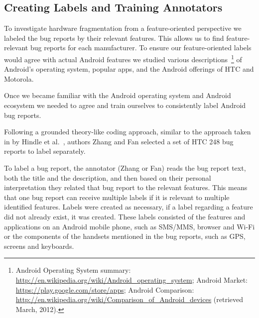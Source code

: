 \documentclass[10pt, conference, compsocconf]{IEEEtran}
\begin{document}
\subsection{Creating Labels and Training Annotators}


To investigate hardware fragmentation from a feature-oriented
perspective we labeled the bug reports by their
relevant features. This allows us to find feature-relevant bug reports
for each manufacturer.
To ensure our feature-oriented labels would agree with actual
Android features we studied various descriptions~\footnote{Android Operating System summary:
\url{http://en.wikipedia.org/wiki/Android_operating_system};
Android Market: \url{https://play.google.com/store/apps};
Android Comparison:
\url{http://en.wikipedia.org/wiki/Comparison_of_Android_devices}
(retrieved March, 2012).}
 of Android's
operating system, popular apps, and the Android offerings of HTC and
Motorola.


Once we became familiar with the Android operating system and Android
ecosystem we needed to agree and train ourselves to consistently label
Android bug reports.


Following a grounded theory-like coding approach, similar to the
approach taken in by Hindle et al.~\cite{Hindle2011}, authors Zhang
and Fan selected a set of HTC 248 bug reports to label
separately. 

To label a bug report, the annotator (Zhang or Fan) reads the bug
report text, both the title and the description, and  then based on their
personal interpretation they related that bug report to the relevant
features. This means that one bug report can receive multiple labels
if it is relevant to multiple identified features. Labels were created
as necessary, if a label regarding a feature did not already exist, it
was created.
These labels 
consisted of the features and applications on an Android mobile
phone, such as SMS/MMS, browser and Wi-Fi or the components of the
handsets mentioned in the bug reports, such as GPS, screens and
keyboards.
\end{document}
